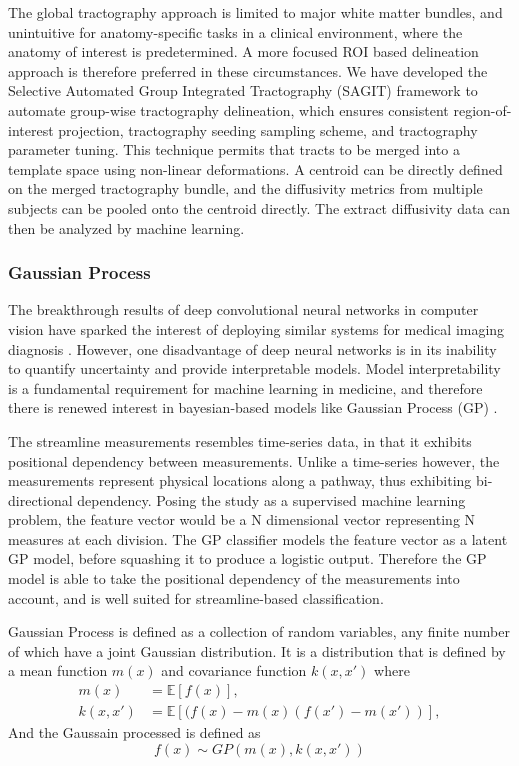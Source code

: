 The global tractography approach is limited to major white matter bundles, and unintuitive for anatomy-specific tasks in a clinical environment, where the anatomy of interest is predetermined. A more focused ROI based delineation approach is therefore preferred in these circumstances. We have developed the Selective Automated Group Integrated Tractography (SAGIT) framework \cite{Chen2016} to automate group-wise tractography delineation, which ensures consistent region-of-interest projection, tractography seeding sampling scheme, and tractography parameter tuning. This technique permits that tracts to be merged into a template space using non-linear deformations. A centroid can be directly defined on the merged tractography bundle, and the diffusivity metrics from multiple subjects can be pooled onto the centroid directly. The extract diffusivity data can then be analyzed by machine learning.

\subsubsection{Gaussian Process}
The breakthrough results of deep convolutional neural networks in computer vision \cite{Krizhevsky2012} have sparked the interest of deploying similar systems for medical imaging diagnosis \cite{Greenspan2016}. However, one disadvantage of deep neural networks is in its inability to quantify uncertainty and provide interpretable models. Model interpretability is a fundamental requirement for machine learning in medicine, and therefore there is renewed interest in bayesian-based models like Gaussian Process (GP) \cite{gal2016dropout}.

The streamline measurements resembles time-series data, in that it exhibits positional dependency between measurements. Unlike a time-series however, the measurements represent physical locations along a pathway, thus exhibiting bi-directional dependency. Posing the study as a supervised machine learning problem, the feature vector would be a N dimensional vector representing N measures at each division. The GP classifier models the feature vector as a latent GP model, before squashing it to produce a logistic output. Therefore the GP model is able to take the positional dependency of the measurements into account, and is well suited for streamline-based classification.

Gaussian Process is defined \cite{rasmussen2006gaussian} as a collection of random variables, any finite number of which have a joint Gaussian distribution. 
It is a distribution that is defined by a mean function $m(x)$ and covariance function $k(x,x') $ where
\begin{equation}
	\begin{split}
		m(x) &= \mathbb{E}[f(x)], \\
		k(x,x') &= \mathbb{E}[(f(x)-m(x)(f(x')-m(x'))],
	\end{split}
\end{equation}
And the Gaussain processed is defined as
\begin{equation}
f(x) \sim GP(m(x), k(x, x')) 
\end{equation}

